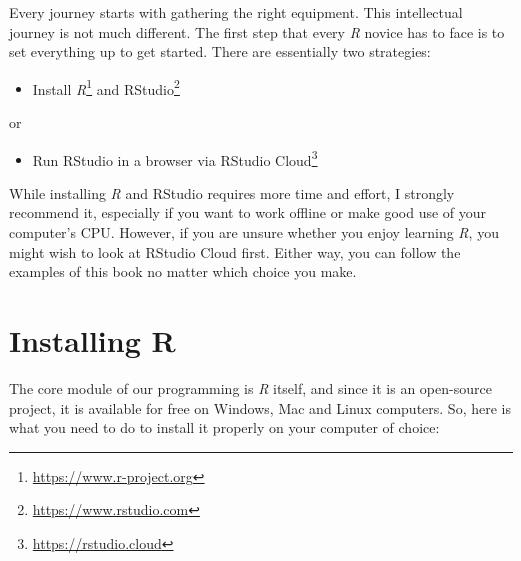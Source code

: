 \documentclass[
  letterpaper,
]{krantz}
\providecommand{\tightlist}{%
  \setlength{\itemsep}{0pt}\setlength{\parskip}{0pt}}\usepackage{longtable,booktabs,array}
\renewcommand{\href}[2]{#2\footnote{\url{#1}}}
\begin{document}
Every journey starts with gathering the right equipment. This
intellectual journey is not much different. The first step that every
\emph{R} novice has to face is to set everything up to get started.
There are essentially two strategies:

\begin{itemize}
\tightlist
\item
  Install \href{https://www.r-project.org}{\emph{R}} and
  \href{https://www.rstudio.com}{RStudio}
\end{itemize}

or

\begin{itemize}
\tightlist
\item
  Run RStudio in a browser via \href{https://rstudio.cloud}{RStudio
  Cloud}
\end{itemize}

While installing \emph{R} and RStudio requires more time and effort, I
strongly recommend it, especially if you want to work offline or make
good use of your computer's CPU. However, if you are unsure whether you
enjoy learning \emph{R}, you might wish to look at RStudio Cloud first.
Either way, you can follow the examples of this book no matter which
choice you make.

\section{Installing R}\label{sec-installing-r}

The core module of our programming is \emph{R} itself, and since it is
an open-source project, it is available for free on Windows, Mac and
Linux computers. So, here is what you need to do to install it properly
on your computer of choice:
\end{document}
